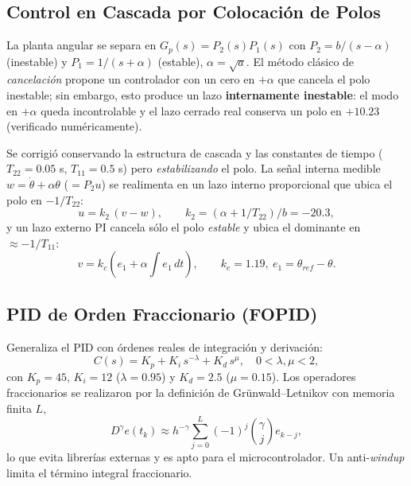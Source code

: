 \documentclass[conference]{IEEEtran}
\begin{document}
\subsection{Control en Cascada por Colocaci\'on de Polos}
La planta angular se separa en $G_p(s)=P_2(s)P_1(s)$ con
$P_2=b/(s-\alpha)$ (inestable) y $P_1=1/(s+\alpha)$ (estable), $\alpha=\sqrt{a}$.
El m\'etodo cl\'asico de \emph{cancelaci\'on} propone un controlador con un cero
en $+\alpha$ que cancela el polo inestable; sin embargo, esto produce un lazo
\textbf{internamente inestable}: el modo en $+\alpha$ queda incontrolable y el
lazo cerrado real conserva un polo en $+10.23$ (verificado num\'ericamente).

Se corrigi\'o conservando la estructura de cascada y las constantes de tiempo
($T_{22}=0.05$ s, $T_{11}=0.5$ s) pero \emph{estabilizando} el polo. La se\~nal
interna medible $w=\dot\theta+\alpha\theta$ ($=P_2 u$) se realimenta en un lazo
interno proporcional que ubica el polo en $-1/T_{22}$:
\begin{equation}
u=k_2\,(v-w),\qquad k_2=(\alpha+1/T_{22})/b=-20.3,
\end{equation}
y un lazo externo PI cancela s\'olo el polo \emph{estable} y ubica el dominante en
$\approx-1/T_{11}$:
\begin{equation}
v=k_c\!\left(e_1+\alpha\!\int e_1\,dt\right),\qquad k_c=1.19,\ e_1=\theta_{ref}-\theta.
\end{equation}

\subsection{PID de Orden Fraccionario (FOPID)}
Generaliza el PID con \'ordenes reales de integraci\'on y derivaci\'on:
\begin{equation}
C(s)=K_p+K_i\,s^{-\lambda}+K_d\,s^{\mu},\quad 0<\lambda,\mu<2,
\end{equation}
con $K_p=45$, $K_i=12$ ($\lambda=0.95$) y $K_d=2.5$ ($\mu=0.15$). Los operadores
fraccionarios se realizaron por la definici\'on de Gr\"unwald--Letnikov con memoria
finita $L$,
\begin{equation}
D^{\gamma}e(t_k)\approx h^{-\gamma}\sum_{j=0}^{L}(-1)^j\binom{\gamma}{j}e_{k-j},
\end{equation}
lo que evita librer\'ias externas y es apto para el microcontrolador. Un
anti-\textit{windup} limita el t\'ermino integral fraccionario.
\end{document}
